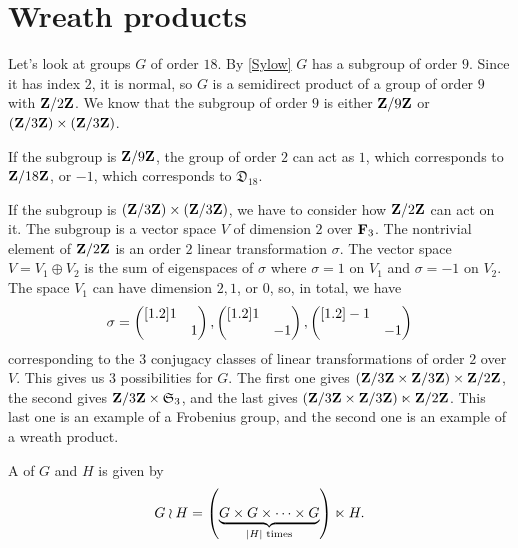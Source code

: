 \documentclass[11pt, twoside]{amsart}
\begin{document}
\section{Wreath products}
Let's look at groups $G$ of order $18$. By \cref{Sylow} $G$ has a subgroup of order $9$. Since it has index $2$, it is normal, so $G$ is a semidirect product of a group of order $9$ with $\mathbf{Z}/2\mathbf{Z}$. We know that the subgroup of order $9$ is either $\mathbf{Z}/9\mathbf{Z}$ or $(\mathbf{Z}/3\mathbf{Z} ) \times (\mathbf{Z}/3\mathbf{Z} )$.

If the subgroup is $\mathbf{Z}/9\mathbf{Z} $, the group of order $2$ can act as $1$, which corresponds to $\mathbf{Z}/18\mathbf{Z}$, or $-1$, which corresponds to $\mathfrak{D}_{18}$.

 If the subgroup is $(\mathbf{Z}/3\mathbf{Z} ) \times (\mathbf{Z}/3\mathbf{Z} )$, we have to consider how $\mathbf{Z}/2\mathbf{Z} $ can act on it. The subgroup is a vector space $V$ of dimension $2$ over $\mathbf F_3$. The nontrivial element of $\mathbf{Z}/2\mathbf{Z}$ is an order $2$ linear transformation $\sigma$. The vector space $V = V_1 \oplus V_2$ is the sum of eigenspaces of $\sigma$ where $\sigma = 1$ on $V_1$ and $\sigma =-1$ on $V_2$. The space $V_1$ can have dimension $2,1$, or $0$, so, in total, we have
$$
\sigma = \begin{pmatrix} [1.2] 1 & \\ & 1\end{pmatrix},\begin{pmatrix} [1.2] 1 & \\ & -1\end{pmatrix},\begin{pmatrix} [1.2] -1 & \\ & -1\end{pmatrix}
$$ 
corresponding to the $3$ conjugacy classes of linear transformations of order $2$ over $V$. This gives us $3$ possibilities for $G$. The first one gives $(\mathbf{Z}/3\mathbf{Z} \times \mathbf{Z}/3\mathbf{Z} )\times \mathbf{Z}/2\mathbf{Z} $, the second gives $\mathbf{Z}/3\mathbf{Z}  \times \mathfrak{S}_3$, and the last gives $(\mathbf{Z}/3\mathbf{Z}  \times \mathbf{Z}/3\mathbf{Z} )\ltimes \mathbf{Z}/2\mathbf{Z} $. This last one is an example of a Frobenius group, and the second one is an example of a {wreath product}.
\begin{definition}
A  of $G$ and $H$ is given by
$$
G\wr H = \left (\underbrace{G \times G \times \cdots \times G}_{\left \lvert H \right \rvert \textrm{ times}}\right)\ltimes H.
$$
\end{definition}
\end{document}
